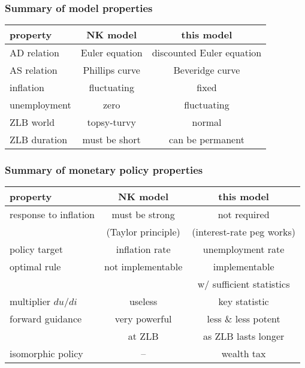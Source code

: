 \documentclass[12pt,xcolor={dvipsnames},hyperref={pdftex,pdfpagemode=UseNone,hidelinks,pdfdisplaydoctitle=true},usepdftitle=false]{beamer}
\begin{document}
\begin{frame}
\end{frame}

\begin{frame}
\frametitle{Summary of model properties}
\begin{table}
\small
\begin{tabular*}{\textwidth}{@{\extracolsep\fill}lcc}
property &  NK model & this model \\
\toprule
AD relation & Euler equation & discounted Euler equation \\
AS relation & Phillips curve  & Beveridge curve \\
inflation &  fluctuating & fixed \\
unemployment &  zero & fluctuating \\
ZLB world & topsy-turvy & normal \\
ZLB duration  & must be short & can be permanent \\
\bottomrule
\end{tabular*}
\end{table}
\end{frame}

\begin{frame}
\frametitle{Summary of monetary policy properties}
\begin{table}
\small
\begin{tabular*}{\textwidth}{@{\extracolsep\fill}lcc}
property &  NK model & this model \\
\toprule
response to inflation & must be strong & not required \\
 & (Taylor principle) & (interest-rate peg works) \\
policy target & inflation rate  & unemployment rate \\
optimal rule &  not implementable & implementable  \\
& & w/ sufficient statistics\\
multiplier $du/di$ & useless & key statistic \\
forward guidance & very powerful & less \& less potent \\
 & at ZLB & as ZLB lasts longer\\
isomorphic policy  & -- & wealth tax \\
\bottomrule
\end{tabular*}
\end{table}
\end{frame}
\end{document}

